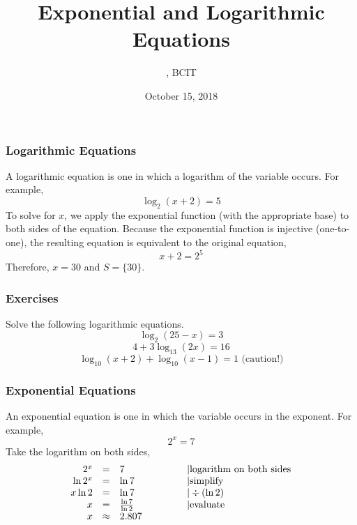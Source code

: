 \documentclass[xcolor=dvipsnames]{beamer}
\title{Exponential and Logarithmic Equations}
\subtitle{{\CourseNumber}, BCIT}
\author{\CourseName}
\date{October 15, 2018}
\begin{document}
\begin{frame}
  \titlepage
\end{frame}

\begin{frame}
  \frametitle{Logarithmic Equations}
A logarithmic equation is one in which a logarithm of the variable
occurs. For example,
\begin{equation}
  \label{eq:idohchie}
  \log_{2}(x+2)=5
\end{equation}
To solve for $x$, we apply the exponential function (with the
appropriate base) to both sides of the equation. Because the
exponential function is injective (one-to-one), the resulting equation
is equivalent to the original equation,
\begin{equation}
  \label{eq:atohluek}
  x+2=2^{5}
\end{equation}
Therefore, $x=30$ and $S=\{30\}$.
\end{frame}

\begin{frame}
  \frametitle{Exercises}
{\ubung} Solve the following logarithmic equations.
  \begin{equation}
    \label{eq:vuoquohz}
\log_{2}(25-x)=3    
  \end{equation}
  \begin{equation}
    \label{eq:oaseihie}
4+3\log_{13}(2x)=16
  \end{equation}
  \begin{equation}
    \label{eq:shiexahm}
\log_{10}(x+2)+\log_{10}(x-1)=1\mbox{ (caution!)}
  \end{equation}
\end{frame}

\begin{frame}
  \frametitle{Exponential Equations}
An exponential equation is one in which the variable occurs in the
exponent. For example,
\begin{equation}
  \label{eq:ofeufowa}
  2^{x}=7
\end{equation}
Take the logarithm on both sides,
\begin{equation}
  \label{eq:cheiyohs}
  \begin{array}{rcll}
    2^{x}&=&7&\hspace{.5in}|\mbox{logarithm on both sides} \\
    \ln{}2^{x}&=&\ln{}7&\hspace{.5in}|\mbox{simplify} \\
    x\ln{}2&=&\ln{}7&\hspace{.5in}|\div{}(\ln{}2) \\
    x&=&\frac{\ln{}7}{\ln{}2}&\hspace{.5in}|\mbox{evaluate} \\
    x&\approx&2.807&
  \end{array}
\end{equation}
\end{frame}
\end{document}
